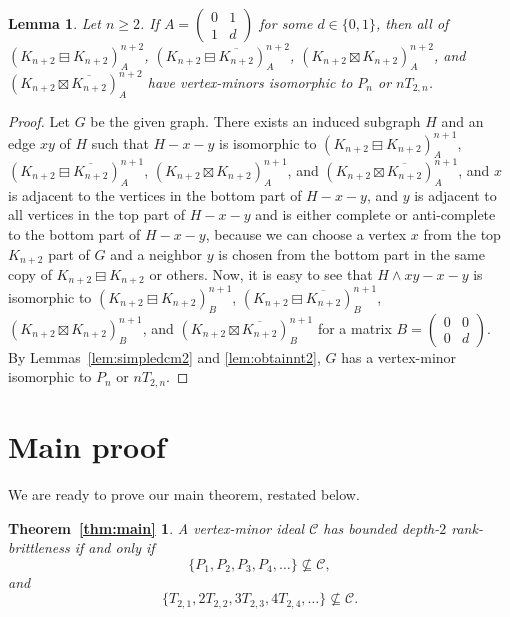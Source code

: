 \documentclass[11pt]{article}
\newtheorem{lemma}[theorem]{Lemma}
\newtheorem*{thm:main}{Theorem~\ref{thm:main}}
\newcommand{\pivot}{\wedge}
\newcommand\mat{\boxminus}
\newcommand\antimat{\boxtimes}
\def\S_#1{\overline{K_{#1}}}
\begin{document}
	\begin{lemma}\label{lem:simpledcm3}
          Let $n\ge 2$.
          If $A=(
          \begin{smallmatrix}
            0 & 1\\
            1 & d 
          \end{smallmatrix}
          )$ for some $d\in\{0,1\}$, then
          all of $(K_{n+2}\mat K_{n+2})^{n+2}_A$,
          $(K_{n+2}\mat \S_{n+2})^{n+2}_A$,
          $(K_{n+2}\antimat K_{n+2})^{n+2}_A$,
          and 
          $(K_{n+2}\antimat \S_{n+2})^{n+2}_A$
          have vertex-minors isomorphic to $P_n$ or $nT_{2,n}$.
%
%
	\end{lemma}
	\begin{proof}
          Let $G$ be the given graph.
          There exists an induced subgraph $H$ and an edge $xy$ of $H$
          such that
          $H- x- y$ is isomorphic to  $(K_{n+2}\mat K_{n+2})^{n+1}_A$,
          $(K_{n+2}\mat \S_{n+2})^{n+1}_A$,
          $(K_{n+2}\antimat K_{n+2})^{n+1}_A$,
          and 
          $(K_{n+2}\antimat \S_{n+2})^{n+1}_A$,
          and $x$ is adjacent to the vertices in the bottom part of $H-x-y$, 
          and $y$ is adjacent to all vertices in the top part of $H-x-y$
          and is either complete or anti-complete to
          the bottom part of $H-x-y$,
          because we can choose a vertex $x$ from the top $K_{n+2}$ part of $G$
          and a neighbor $y$ is chosen from the bottom part in the same copy of $K_{n+2}\mat K_{n+2}$ or others.
          Now, it is easy to see that $H\pivot xy-x-y$ is isomorphic to
 $(K_{n+2}\mat K_{n+2})^{n+1}_B$,
          $(K_{n+2}\mat \S_{n+2})^{n+1}_B$,
          $(K_{n+2}\antimat K_{n+2})^{n+1}_B$,
          and 
          $(K_{n+2}\antimat \S_{n+2})^{n+1}_B$
          for a matrix $B=
          (\begin{smallmatrix}
            0  & 0\\
            0 & d
          \end{smallmatrix})$.
          By Lemmas~\ref{lem:simpledcm2} and \ref{lem:obtainnt2},
          $G$ has a vertex-minor isomorphic to $P_n$ or $nT_{2,n}$.
	\end{proof}



\section{Main proof}\label{sec:mainproof}

	We are ready to prove our main theorem, restated below.
	\begin{thm:main}
	A vertex-minor ideal $\mathcal{C}$ has bounded depth-$2$ rank-brittleness if and only if 
		\[ \{P_1, P_2, P_3, P_4, \ldots \}\nsubseteq \mathcal{C}, \]
		and
		\[ \{T_{2,1}, 2T_{2,2}, 3T_{2,3}, 4T_{2,4}, \ldots \}\nsubseteq \mathcal{C}. \]
	\end{thm:main}
	
\end{document}
